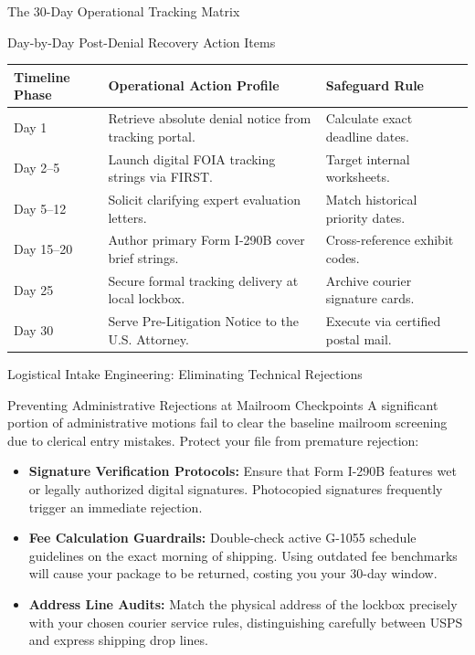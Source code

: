 \documentclass[11pt]{beamer}
\begin{document}
	
	\begin{frame}{The 30-Day Operational Tracking Matrix}
		\scriptsize
		\begin{block}{Day-by-Day Post-Denial Recovery Action Items}
			\centering
			\begin{tabular}{|p{2cm}|p{6cm}|p{3cm}|}
				\hline
				\textbf{Timeline Phase} & \textbf{Operational Action Profile} & \textbf{Safeguard Rule} \\
				\hline
				Day 1 & Retrieve absolute denial notice from tracking portal. & Calculate exact deadline dates. \\
				\hline
				Day 2--5 & Launch digital FOIA tracking strings via FIRST. & Target internal worksheets. \\
				\hline
				Day 5--12 & Solicit clarifying expert evaluation letters. & Match historical priority dates. \\
				\hline
				Day 15--20 & Author primary Form I-290B cover brief strings. & Cross-reference exhibit codes. \\
				\hline
				Day 25 & Secure formal tracking delivery at local lockbox. & Archive courier signature cards. \\
				\hline
				Day 30 & Serve Pre-Litigation Notice to the U.S. Attorney. & Execute via certified postal mail. \\
				\hline
			\end{tabular}
		\end{block}
	\end{frame}
	
	\begin{frame}{Logistical Intake Engineering: Eliminating Technical Rejections}
		\scriptsize
		\begin{block}{Preventing Administrative Rejections at Mailroom Checkpoints}
			A significant portion of administrative motions fail to clear the baseline mailroom screening due to clerical entry mistakes. Protect your file from premature rejection:
			\begin{itemize}
				\item \textbf{Signature Verification Protocols:} Ensure that Form I-290B features wet or legally authorized digital signatures. Photocopied signatures frequently trigger an immediate rejection.
				\item \textbf{Fee Calculation Guardrails:} Double-check active G-1055 schedule guidelines on the exact morning of shipping. Using outdated fee benchmarks will cause your package to be returned, costing you your 30-day window.
				\item \textbf{Address Line Audits:} Match the physical address of the lockbox precisely with your chosen courier service rules, distinguishing carefully between USPS and express shipping drop lines.
			\end{itemize}
		\end{block}
	\end{frame}
	
\end{document}
